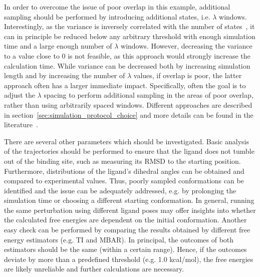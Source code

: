 \documentclass[9pt,bestpractices]{livecoms}
\begin{document}
In order to overcome the issue of poor overlap in this example, additional sampling should be performed by introducing additional states, i.e. $\lambda$ windows.
%
Interestingly, as the variance is inversely correlated with the number of states~\cite{klimovich2015guidelines}, it can in principle be reduced below any arbitrary threshold with enough simulation time and a large enough number of $\lambda$ windows. However, decreasing the variance to a value close to 0 is not feasible, as this approach would strongly increase the calculation time. While variance can be decreased both by increasing simulation length and by increasing the number of $\lambda$ values, if overlap is poor, the latter approach often has a larger immediate impact.  Specifically, often the goal is to adjust the $\lambda$ spacing to perform additional sampling in the areas of poor overlap, rather than using arbitrarily spaced windows. Different approaches are described in section~\ref{sec:simulation_protocol_choice} and more details can be found in the literature~\cite{dakka2018concurrent, hahn2019alchemical}.
%

There are several other parameters which should be investigated. Basic analysis of the trajectories should be performed to ensure that the ligand does not tumble out of the binding site, such as measuring its RMSD to the starting position. Furthermore, distributions of the ligand's dihedral angles can be obtained and compared to experimental values. Thus, poorly sampled conformations can be identified and the issue can be adequately addressed, e.g. by prolonging the simulation time or choosing a different starting conformation. In general, running the same perturbation using different ligand poses may offer insights into whether the calculated free energies are dependent on the initial conformation.
Another easy check can be performed by comparing the results obtained by different free energy estimators (e.g. TI and MBAR). In principal, the outcomes of both estimators should be the same (within a certain range). Hence, if the outcomes deviate by more than a predefined threshold (e.g. 1.0 kcal/mol), the free energies are likely unreliable and further calculations are necessary.
%
\end{document}
